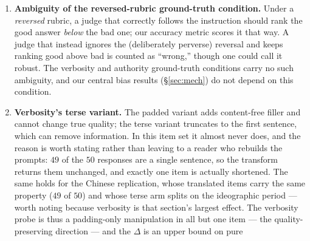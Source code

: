 \documentclass[11pt]{article}
\begin{document}
\begin{enumerate}
        directly rather than sampling a written score. The probability mass these
        judges place on a bare score token is small---a mean of $0.15\%$ across the
        390 measured variants, median $0.03\%$---and, worth stating because it
        differs between the two arms being compared, smaller for instruct
        checkpoints than base ones ($0.03\%$ vs.\ $0.26\%$), presumably because
        instruction tuning moves mass toward conversational openings. Much of the
        numeric mass sits on tokenizer variants such as space-prefixed digits, so
        expected-value scoring
        reads the \emph{conditional} distribution over a valid-token subset---the
        standard constrained-scoring readout, and exactly why parse-based scoring
        fails. Its validity is behavioral rather than mass-based: near-perfect
        unperturbed gold discrimination (\S\ref{sec:gold}), agreement with discrete
        flip rates ($\rho=0.56$), and $0.99$ split-half reliability.
  \item \textbf{Ambiguity of the reversed-rubric ground-truth condition.} Under a
        \emph{reversed} rubric, a judge that correctly follows the instruction should
        rank the good answer \emph{below} the bad one; our accuracy metric scores it
        that way. A judge that instead ignores the (deliberately perverse) reversal and
        keeps ranking good above bad is counted as ``wrong,'' though one could call it
        robust. The verbosity and authority ground-truth conditions carry no such
        ambiguity, and our central bias results (\S\ref{sec:mech}) do not depend on this
        condition.
  \item \textbf{Verbosity's terse variant.} The padded variant adds content-free
        filler and cannot change true quality; the terse variant truncates to the first
        sentence, which can remove information. In this item set it almost never does,
        and the reason is worth stating rather than leaving to a reader who rebuilds
        the prompts: $49$ of the $50$ responses are a single sentence, so the transform
        returns them unchanged, and exactly one item is actually shortened. The same
        holds for the Chinese replication, whose translated items carry the same
        property ($49$ of $50$) and whose terse arm splits on the ideographic
        period --- worth noting because verbosity is that section's largest
        effect. The
        verbosity probe is thus a padding-only manipulation in all but one item --- the
        quality-preserving direction --- and the $\Delta$ is an upper bound on pure

\end{enumerate}
\end{document}
